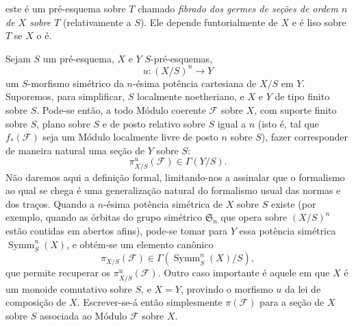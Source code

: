 este é um pré-esquema sobre $T$ chamado \emph{fibrado dos germes de seções de
ordem $n$ de $X$ sobre $T$} (relativamente a $S$). Ele depende funtorialmente
de $X$ e é liso sobre $T$ se $X$ o é.


Sejam $S$ um pré-esquema, $X$ e $Y$ $S$-pré-esquemas,
\[
u:(X/S)^n\longrightarrow Y
\]
um $S$-morfismo simétrico da $n$-ésima potência cartesiana de $X/S$ em $Y$.
Suporemos, para simplificar, $S$ localmente noetheriano, e $X$ e $Y$ de tipo
finito sobre $S$. Pode-se então, a todo Módulo coerente $\mathcal F$ sobre $X$,
com suporte finito sobre $S$, plano sobre $S$ e de posto relativo sobre $S$
igual a $n$ (isto é, tal que $f_*(\mathcal F)$ seja um Módulo localmente livre
de posto $n$ sobre $S$), fazer corresponder de maneira natural uma seção de $Y$
sobre $S$:
\[
\pi^u_{X/S}(\mathcal F)\in\Gamma(Y/S).
\]
Não daremos aqui a definição formal, limitando-nos a assinalar que o formalismo
ao qual se chega é uma generalização natural do formalismo usual das normas e
dos traços. Quando a $n$-ésima potência simétrica de $X$ sobre $S$ existe (por
exemplo, quando as órbitas do grupo simétrico $\mathfrak S_n$ que opera sobre
$(X/S)^n$ estão contidas em abertos afins), pode-se tomar para $Y$ essa
potência simétrica $\operatorname{Symm}^n_S(X)$, e obtém-se um elemento canônico
\[
\pi_{X/S}(\mathcal F)\in\Gamma(\operatorname{Symm}^n_S(X)/S),
\]
que permite recuperar os $\pi^u_{X/S}(\mathcal F)$. Outro caso importante é
aquele em que $X$ é um monoide comutativo sobre $S$, e $X=Y$, provindo o
morfismo $u$ da lei de composição de $X$. Escrever-se-á então simplesmente
$\pi(\mathcal F)$ para a seção de $X$ sobre $S$ associada ao Módulo
$\mathcal F$ sobre $X$.

